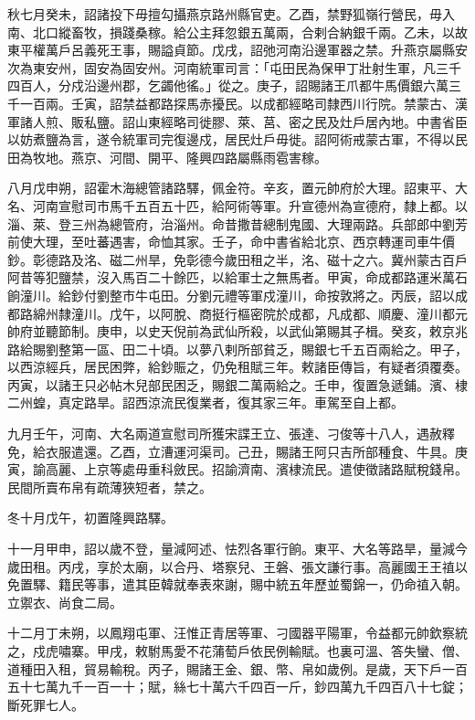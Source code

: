 \begin{pinyinscope}
 秋七月癸未，詔諸投下毋擅勾攝燕京路州縣官吏。乙酉，禁野狐嶺行營民，毋入南、北口縱畜牧，損踐桑稼。給公主拜忽銀五萬兩，合剌合納銀千兩。乙未，以故東平權萬戶呂義死王事，賜謚貞節。戊戌，詔弛河南沿邊軍器之禁。升燕京屬縣安次為東安州，固安為固安州。河南統軍司言：「屯田民為保甲丁壯射生軍，凡三千四百人，分戍沿邊州郡，乞蠲他徭。」從之。庚子，詔賜諸王爪都牛馬價銀六萬三千一百兩。壬寅，詔禁益都路探馬赤擾民。以成都經略司隸西川行院。禁蒙古、漢軍諸人煎、販私鹽。詔山東經略司徙膠、萊、莒、密之民及灶戶居內地。中書省臣以妨煮鹽為言，遂令統軍司完復邊戍，居民灶戶毋徙。詔阿術戒蒙古軍，不得以民田為牧地。燕京、河間、開平、隆興四路屬縣雨雹害稼。



 八月戊申朔，詔霍木海總管諸路驛，佩金符。辛亥，置元帥府於大理。詔東平、大名、河南宣慰司市馬千五百五十匹，給阿術等軍。升宣德州為宣德府，隸上都。以淄、萊、登三州為總管府，治淄州。命昔撒昔總制鬼國、大理兩路。兵部郎中劉芳前使大理，至吐蕃遇害，命恤其家。壬子，命中書省給北京、西京轉運司車牛價鈔。彰德路及洺、磁二州旱，免彰德今歲田租之半，洺、磁十之六。冀州蒙古百戶阿昔等犯鹽禁，沒入馬百二十餘匹，以給軍士之無馬者。甲寅，命成都路運米萬石餉潼川。給鈔付劉整市牛屯田。分劉元禮等軍戍潼川，命按敦將之。丙辰，詔以成都路綿州隸潼川。戊午，以阿脫、商挺行樞密院於成都，凡成都、順慶、潼川都元帥府並聽節制。庚申，以史天倪前為武仙所殺，以武仙第賜其子楫。癸亥，敕京兆路給賜劉整第一區、田二十頃。以夢八剌所部貧乏，賜銀七千五百兩給之。甲子，以西涼經兵，居民困弊，給鈔賑之，仍免租賦三年。敕諸臣傳旨，有疑者須覆奏。丙寅，以諸王只必帖木兒部民困乏，賜銀二萬兩給之。壬申，復置急遞鋪。濱、棣二州蝗，真定路旱。詔西涼流民復業者，復其家三年。車駕至自上都。



 九月壬午，河南、大名兩道宣慰司所獲宋諜王立、張達、刁俊等十八人，遇赦釋免，給衣服遣還。乙酉，立漕運河渠司。己丑，賜諸王阿只吉所部種食、牛具。庚寅，諭高麗、上京等處毋重科斂民。招諭濟南、濱棣流民。遣使徵諸路賦稅錢帛。民間所賣布帛有疏薄狹短者，禁之。



 冬十月戊午，初置隆興路驛。



 十一月甲申，詔以歲不登，量減阿述、怯烈各軍行餉。東平、大名等路旱，量減今歲田租。丙戌，享於太廟，以合丹、塔察兒、王磐、張文謙行事。高麗國王王禃以免置驛、籍民等事，遣其臣韓就奉表來謝，賜中統五年歷並蜀錦一，仍命禃入朝。立禦衣、尚食二局。



 十二月丁未朔，以鳳翔屯軍、汪惟正青居等軍、刁國器平陽軍，令益都元帥欽察統之，戍虎嘯寨。甲戌，敕駙馬愛不花蒲萄戶依民例輸賦。也裏可溫、答失蠻、僧、道種田入租，貿易輸稅。丙子，賜諸王金、銀、幣、帛如歲例。是歲，天下戶一百五十七萬九千一百一十；賦，絲七十萬六千四百一斤，鈔四萬九千四百八十七錠；斷死罪七人。




\end{pinyinscope}

